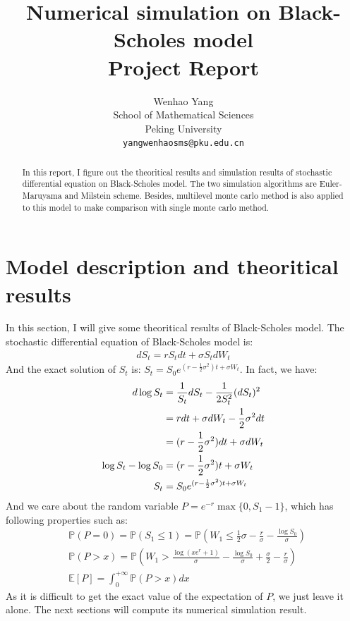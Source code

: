 \documentclass{article} %
\title{Numerical simulation on Black-Scholes model \\ Project Report}
\author{Wenhao Yang\\
School of Mathematical Sciences\\
Peking University\\
\texttt{yangwenhaosms@pku.edu.cn} \\
}
\begin{document}
\graphicspath{{../result/}}
\maketitle

\begin{abstract}
In this report, I figure out the theoritical results and simulation results of stochastic differential equation on Black-Scholes model. The two simulation algorithms are Euler-Maruyama and Milstein scheme. Besides, multilevel monte carlo method is also applied to this model to make comparison with single monte carlo method.
\end{abstract}

\section{Model description and theoritical results}
In this section, I will give some theoritical results of Black-Scholes model. The stochastic differential equation of Black-Scholes model is:
\begin{align}
  dS_{t}=rS_{t}dt+\sigma S_{t}dW_{t}
\end{align}
And the exact solution of $S_{t}$ is: $S_{t}=S_{0}e^{(r-\frac{1}{2}\sigma^{2})t+\sigma W_{t}}$. In fact, we have:
\begin{align}
  d\log S_{t}&=\frac{1}{S_{t}}dS_{t}-\frac{1}{2S^{2}_{t}}(dS_{t})^{2}\notag\\
  &=rdt+\sigma dW_{t}-\frac{1}{2}\sigma^{2}dt\notag\\
  &=(r-\frac{1}{2}\sigma^{2})dt+\sigma dW_{t}\\
  \log S_{t}-\log S_{0}&=(r-\frac{1}{2}\sigma^{2})t+\sigma W_{t}\\
  S_{t}&=S_{0}e^{(r-\frac{1}{2}\sigma^{2})t+\sigma W_{t}}
\end{align}
And we care about the random variable $P=e^{-r}\max\{0,S_{1}-1\}$, which has following properties such as:
\begin{align}
  &\mathbb{P}(P=0)=\mathbb{P}(S_{1}\le 1)=\mathbb{P}(W_{1}\le\frac{1}{2}\sigma-\frac{r}{\sigma}-\frac{\log S_{0}}{\sigma})\\
  &\mathbb{P}(P>x)=\mathbb{P}(W_{1}>\frac{\log(xe^{r}+1)}{\sigma}-\frac{\log S_{0}}{\sigma}+\frac{\sigma}{2}-\frac{r}{\sigma})\\
  &\mathbb{E}[P]=\int_{0}^{+\infty}\mathbb{P}(P>x)dx
\end{align}
As it is difficult to get the exact value of the expectation of $P$, we just leave it alone. The next sections will compute its numerical simulation result.
\end{document}
